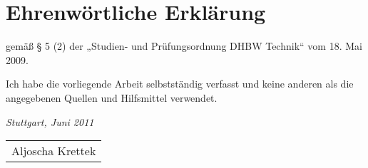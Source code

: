 \chapter*{Ehrenwörtliche Erklärung}
\thispagestyle{empty}
gemäß § 5 (2) der „Studien- und Prüfungsordnung DHBW Technik“ vom 18. Mai 2009.

\bigskip

\noindent Ich habe die vorliegende Arbeit selbstständig verfasst und keine anderen als die angegebenen
Quellen und Hilfsmittel verwendet.

\bigskip
 
\noindent\textit{Stuttgart, Juni 2011}

\smallskip

\begin{flushright}
    \begin{tabular}{m{5cm}}
        \\ \hline
        \centering Aljoscha Krettek \\
    \end{tabular}
\end{flushright}

